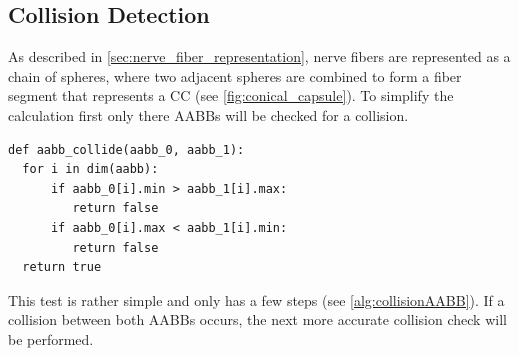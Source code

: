 \subsection{Collision Detection}
\label{sec:collisionDetection}
% 
\begin{lstfloat}[!t]
\caption{Collision detection between two capsule objects. The distance as well as the points on the line segments is returned. A collision takes place if the distance is smaller than $\mathit{cone_a.r}+\mathit{cone_b.r} > d$. }
\label{alg:pseudocodeCollisionDetection}
\end{lstfloat}
% 
As described in \cref{sec:nerve_fiber_representation}, nerve fibers are represented as a chain of spheres, where two adjacent spheres are combined to form a fiber segment that represents a \ac{CC} (see \cref{fig:conical_capsule}).
% 
To simplify the calculation first only there \acp{AABB} will be checked for a collision.
% 
\begin{lstfloat}[!tb]
\lstset{style=python}
\begin{lstlisting}[]
def aabb_collide(aabb_0, aabb_1):
  for i in dim(aabb):
      if aabb_0[i].min > aabb_1[i].max:
         return false
      if aabb_0[i].max < aabb_1[i].min:
         return false
  return true
\end{lstlisting}
\caption{Pseudocode collision between \acp{AABB}.}
\label{alg:collisionAABB}
\end{lstfloat}
% 
This test is rather simple and only has a few steps (see \cref{alg:collisionAABB}).
If a collision between both \acp{AABB} occurs, the next more accurate collision check will be performed.

